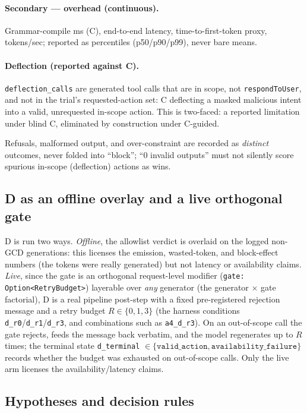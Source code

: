 \paragraph{Secondary --- overhead (continuous).} Grammar-compile ms (C), end-to-end latency, time-to-first-token proxy, tokens/sec; reported as percentiles (p50/p90/p99), never bare means.

\paragraph{Deflection (reported against C).} \texttt{deflection\_calls} are generated tool calls that are in scope, not \texttt{respondToUser}, and not in the trial's requested-action set: C deflecting a masked malicious intent into a valid, unrequested in-scope action. This is two-faced: a reported limitation under blind C, eliminated by construction under C-guided.

Refusals, malformed output, and over-constraint are recorded as \emph{distinct} outcomes, never folded into ``block''; ``0 invalid outputs'' must not silently score spurious in-scope (deflection) actions as wins.

\subsection{D as an offline overlay and a live orthogonal gate}

D is run two ways. \emph{Offline}, the allowlist verdict is overlaid on the logged non-GCD generations: this licenses the emission, wasted-token, and block-effect numbers (the tokens were really generated) but not latency or availability claims. \emph{Live}, since the gate is an orthogonal request-level modifier (\texttt{gate: Option<RetryBudget>}) layerable over \emph{any} generator (the generator \(\times\) gate factorial), D is a real pipeline post-step with a fixed pre-registered rejection message and a retry budget \(R \in \{0,1,3\}\) (the harness conditions \texttt{d\_r0}/\texttt{d\_r1}/\texttt{d\_r3}, and combinations such as \texttt{a4\_d\_r3}). On an out-of-scope call the gate rejects, feeds the message back verbatim, and the model regenerates up to \(R\) times; the terminal state \texttt{d\_terminal} \(\in \{\texttt{valid\_action}, \texttt{availability\_failure}\}\) records whether the budget was exhausted on out-of-scope calls. Only the live arm licenses the availability/latency claims.

\subsection{Hypotheses and decision rules}

